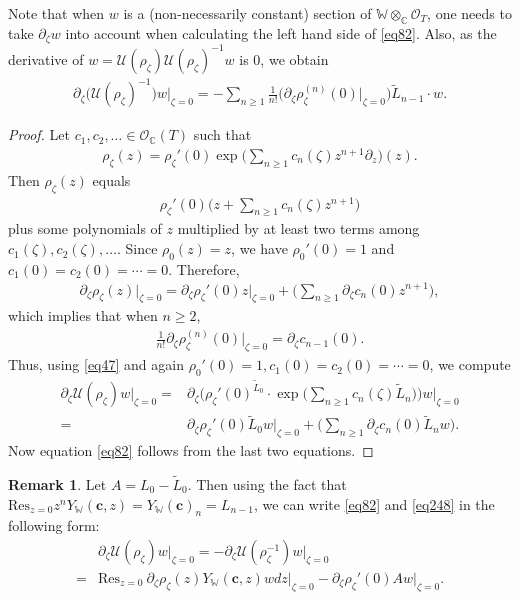 \documentclass[12pt,b5paper,notitlepage]{report}
\theoremstyle{definition}
\newtheorem{rem}[df]{Remark}
\theoremstyle{plain}
\newcommand{\mc}{\mathcal}
\newcommand{\wtd}{\widetilde}
\newcommand{\Res}{\mathrm{Res}}
\newcommand{\scr}{\mathscr}
\newcommand{\Wbb}{\mathbb W}
\newcommand{\Cbb}{\mathbb C}
\newcommand{\cbf}{\mathbf c}
\numberwithin{equation}{section}
\begin{document}
Note that when $w$ is a (non-necessarily constant) section of $\Wbb\otimes_\Cbb\scr O_T$, one needs to take $\partial_\zeta w$ into account when calculating the left hand side of \eqref{eq82}. Also, as the derivative of $w=\mc U(\rho_\zeta)\mc U(\rho_\zeta)^{-1}w$ is $0$, we obtain
\begin{align}
\partial_\zeta\big(\mc U(\rho_\zeta)^{-1}\big)w\Big|_{\zeta=0}=-\sum_{n\geq 1}\frac 1{n!}\Big(\partial_\zeta\rho_\zeta^{(n)}(0)\Big|_{\zeta=0}\Big)\wtd L_{n-1}\cdot w.\label{eq248}
\end{align}


\begin{proof}
Let $c_1,c_2,\dots\in\scr O_{\Cbb}(T)$ such that 
\begin{gather*}
\rho_\zeta(z)=\rho_\zeta'(0)\exp\Big(\sum_{n\geq 1}c_n(\zeta)z^{n+1}\partial_z\Big)(z).
\end{gather*}
Then $\rho_\zeta(z)$ equals
\begin{align*}
\rho_\zeta'(0)\Big(z+\sum_{n\geq 1}c_n(\zeta)z^{n+1}\Big)
\end{align*}
plus some polynomials of $z$ multiplied by at least two terms among $c_1(\zeta),c_2(\zeta),\dots$. Since $\rho_0(z)=z$, we have $\rho_0'(0)=1$ and $c_1(0)=c_2(0)=\cdots=0$. Therefore,
\begin{align*}
\partial_\zeta\rho_\zeta(z)\Big|_{\zeta=0}=\partial_\zeta\rho_\zeta'(0)z\Big|_{\zeta=0}+\Big(\sum_{n\geq 1}\partial_\zeta c_n(0)z^{n+1}\Big),
\end{align*}
which implies that when $n\geq 2$,
\begin{align*}
\frac 1{n!}\partial_\zeta\rho_\zeta^{(n)}(0)\Big|_{\zeta=0}=\partial_\zeta c_{n-1}(0).
\end{align*}
Thus, using \eqref{eq47} and again $\rho_0'(0)=1,c_1(0)=c_2(0)=\cdots=0$, we compute
\begin{align*}
\partial_\zeta\mc U(\rho_\zeta)w\Big|_{\zeta=0}=&\partial_\zeta\Big(\rho_\zeta'(0)^{\wtd L_0}\cdot \exp\Big(\sum_{n\geq1}c_n(\zeta) \wtd L_n\Big)\Big)w\Big|_{\zeta=0}\\
=&\partial_\zeta\rho_\zeta'(0)\wtd L_0w\Big|_{\zeta=0}+\Big(\sum_{n\geq 1}\partial_\zeta c_n(0)\wtd L_nw\Big).
\end{align*}
Now equation \eqref{eq82} follows from the last two equations.
\end{proof}

\begin{rem}\label{lb140}
Let $A=L_0-\wtd L_0$. Then using the fact that $\Res_{z=0}z^n Y_\Wbb(\cbf,z)=Y_\Wbb(\cbf)_n=L_{n-1}$, we can write \eqref{eq82} and \eqref{eq248} in the following form:
\begin{align}
&\partial_\zeta\mc U(\rho_\zeta)w\big|_{\zeta=0}=-\partial_\zeta\mc U(\rho_\zeta^{-1})w\big|_{\zeta=0}\nonumber\\
=&\Res_{z=0}~\partial_\zeta\rho_\zeta(z) Y_\Wbb(\cbf,z) w dz\big|_{\zeta=0}-\partial_\zeta\rho_\zeta'(0)Aw\big|_{\zeta=0}.
\end{align}
\end{rem}
\end{document}
